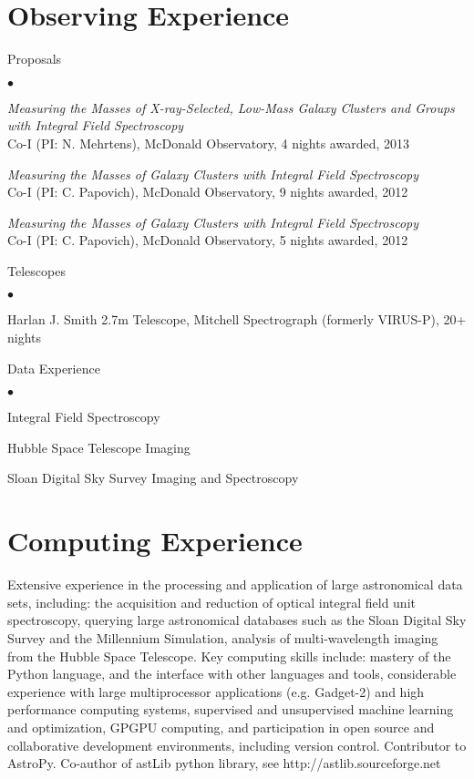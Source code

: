 \documentclass[margin,line, 11pt]{Boada_res}
\newenvironment{list2}{
  \begin{list}{$\bullet$}{%
      \setlength{\itemsep}{0in}
      \setlength{\parsep}{0in} \setlength{\parskip}{0in}
      \setlength{\topsep}{0in} \setlength{\partopsep}{0in} 
      \setlength{\leftmargin}{0.2in}}}{\end{list}}
\begin{document}
\begin{resume}
\section{\sc Observing Experience}
Proposals
    \begin{list2}
        \vspace*{.05in}
    \item \emph{Measuring the Masses of X-ray-Selected, Low-Mass Galaxy Clusters and Groups with Integral Field Spectroscopy}\\
		Co-I (PI: N. Mehrtens), McDonald Observatory, 4 nights awarded, 2013
    \item \emph{Measuring the Masses of Galaxy Clusters with Integral Field Spectroscopy}\\
		Co-I (PI: C. Papovich), McDonald Observatory, 9 nights awarded, 2012
    \item \emph{Measuring the Masses of Galaxy Clusters with Integral Field Spectroscopy}\\
		Co-I (PI: C. Papovich), McDonald Observatory, 5 nights awarded, 2012
	\end{list2}
Telescopes
    \begin{list2}
        \vspace*{.05in}
    \item Harlan J. Smith 2.7m Telescope, Mitchell Spectrograph (formerly VIRUS-P), 20+ nights
	\end{list2}
Data Experience
    \begin{list2}
        \vspace*{.05in}
		\item Integral Field Spectroscopy
    	\item Hubble Space Telescope Imaging
		\item Sloan Digital Sky Survey Imaging and Spectroscopy
	\end{list2}

\section{\sc Computing Experience} 
Extensive experience in the processing and application of large astronomical data sets, including: the acquisition and reduction of optical integral field unit spectroscopy, querying large astronomical databases such as the Sloan Digital Sky Survey and the Millennium Simulation, analysis of multi-wavelength imaging from the Hubble Space Telescope. Key computing skills include: mastery of the Python language, and the interface with other languages and tools, considerable experience with large multiprocessor applications (e.g. Gadget-2) and high performance computing systems, supervised and unsupervised machine learning and optimization, GPGPU computing, and participation in open source and collaborative development environments, including version control. Contributor to {\sc AstroPy}. Co-author of {\sc astLib} python library, see http://astlib.sourceforge.net
\vspace*{-3mm}


\end{resume}
\end{document}
